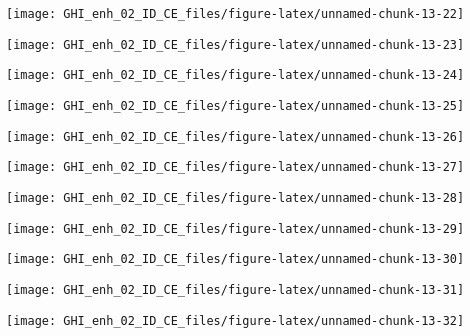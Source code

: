 \documentclass[
  10pt,
  a4paper,oneside]{article}
\begin{document}
\begin{center}\texttt{[image: GHI\_enh\_02\_ID\_CE\_files/figure-latex/unnamed-chunk-13-22]} \end{center}

\begin{center}\texttt{[image: GHI\_enh\_02\_ID\_CE\_files/figure-latex/unnamed-chunk-13-23]} \end{center}

\begin{center}\texttt{[image: GHI\_enh\_02\_ID\_CE\_files/figure-latex/unnamed-chunk-13-24]} \end{center}

\begin{center}\texttt{[image: GHI\_enh\_02\_ID\_CE\_files/figure-latex/unnamed-chunk-13-25]} \end{center}

\begin{center}\texttt{[image: GHI\_enh\_02\_ID\_CE\_files/figure-latex/unnamed-chunk-13-26]} \end{center}

\begin{center}\texttt{[image: GHI\_enh\_02\_ID\_CE\_files/figure-latex/unnamed-chunk-13-27]} \end{center}

\begin{center}\texttt{[image: GHI\_enh\_02\_ID\_CE\_files/figure-latex/unnamed-chunk-13-28]} \end{center}

\begin{center}\texttt{[image: GHI\_enh\_02\_ID\_CE\_files/figure-latex/unnamed-chunk-13-29]} \end{center}

\begin{center}\texttt{[image: GHI\_enh\_02\_ID\_CE\_files/figure-latex/unnamed-chunk-13-30]} \end{center}

\begin{center}\texttt{[image: GHI\_enh\_02\_ID\_CE\_files/figure-latex/unnamed-chunk-13-31]} \end{center}

\begin{center}\texttt{[image: GHI\_enh\_02\_ID\_CE\_files/figure-latex/unnamed-chunk-13-32]} \end{center}
\end{document}
